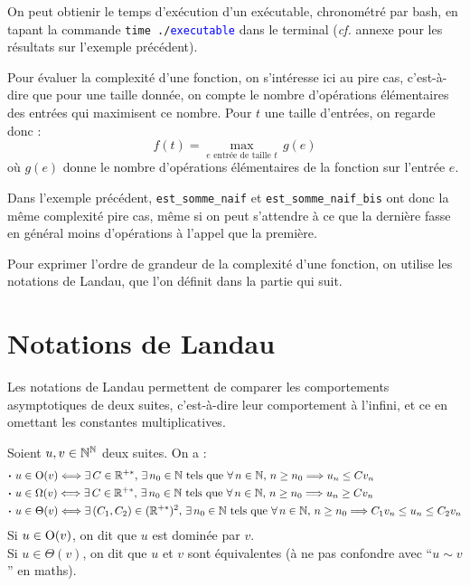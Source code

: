 	\begin{Remarque}
		On peut obtienir le temps d'exécution d'un exécutable, chronométré par bash, en tapant la commande \texttt{time ./\textcolor{blue}{executable}} dans le terminal (\emph{cf.} annexe pour les résultats sur l'exemple précédent).
	\end{Remarque}
		
	Pour évaluer la complexité d'une fonction, on s'intéresse ici au pire cas, c'est-à-dire que pour une taille donnée, on compte le nombre d'opérations élémentaires des entrées qui maximisent ce nombre. \nt
	Pour \(t\) une taille d'entrées, on regarde donc :
		\[
			f(t) = \max_{e \text{ entrée de taille } t} \, g(e)
		\]
	où \(g(e)\) donne le nombre d'opérations élémentaires de la fonction sur l'entrée \(e\).
	\begin{Exemple}
		Dans l'exemple précédent, \texttt{est\_somme\_naif} et \texttt{est\_somme\_naif\_bis} ont donc la même complexité pire cas, même si on peut s'attendre à ce que la dernière fasse en général moins d'opérations à l'appel que la première.
	\end{Exemple}
	Pour exprimer l'ordre de grandeur de la complexité d'une fonction, on utilise les notations de Landau, que l'on définit dans la partie qui suit.
	
\section{Notations de Landau}

	Les notations de Landau permettent de comparer les comportements asymptotiques de deux suites, c'est-à-dire leur comportement à l'infini, et ce en omettant les constantes multiplicatives.
	
	\pagebreak
	\begin{Definitions}
		Soient \(u, v \in \bb{N}^\bb{N}\) deux suites. On a :
		\begin{align*}
			& \text{\bdot} u \in \rm{O}(v) \iff \exists \, C \in \bb{R}^{+*}, \, \exists \, n_0 \in \bb{N} \text{ tels que } \forall \, n \in \bb{N}, \, n \geq n_0 \Longrightarrow u_n \leq C v_n \\
			& \text{\bdot} u \in \Omega(v) \iff \exists \, C \in \bb{R}^{+*}, \, \exists \, n_0 \in \bb{N} \text{ tels que } \forall \, n \in \bb{N}, \, n \geq n_0 \Longrightarrow u_n \geq C v_n \\
			& \text{\bdot} u \in \Theta(v) \iff \exists \, (C_1,C_2) \in (\bb{R}^{+*})^2, \, \exists \, n_0 \in \bb{N} \text{ tels que } \forall \, n \in \bb{N}, \, n \geq n_0 \Longrightarrow C_1v_n \leq u_n \leq C_2v_n
		\end{align*}
	Si \(u \in \rm{O}(v)\), on dit que \(u\) est dominée par \(v\). \\
	Si \(u \in \Theta(v)\), on dit que \(u\) et \(v\) sont équivalentes (à ne pas confondre avec ``\(u \sim v\)'' en maths).
	\end{Definitions}
	
